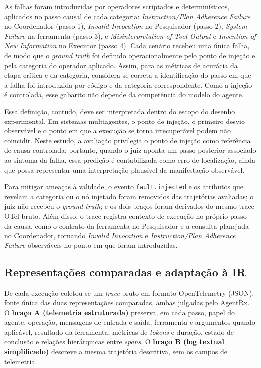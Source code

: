 \documentclass[sigconf]{acmart}
\begin{document}
As falhas foram introduzidas por operadores scriptados e determinísticos, aplicados no passo causal de cada categoria:
\textit{Instruction/Plan Adherence Failure} no Coordenador (passo 1), \textit{Invalid Invocation} no Pesquisador (passo
2), \textit{System Failure} na ferramenta (passo 3), e \textit{Misinterpretation of Tool Output} e \textit{Invention of
	New Information} no Executor (passo 4). Cada cenário recebeu uma única falha, de modo que o \textit{ground truth} foi
definido operacionalmente pelo ponto de injeção e pela categoria do operador aplicado. Assim, para as métricas de
acurácia da etapa crítica e da categoria, considera-se correta a identificação do passo em que a falha foi introduzida
por código e da categoria correspondente. Como a injeção é controlada, esse gabarito não depende da competência do
modelo do agente.

Essa definição, contudo, deve ser interpretada dentro do escopo do desenho experimental. Em sistemas multiagentes, o
ponto de injeção, o primeiro desvio observável e o ponto em que a execução se torna irrecuperável podem não coincidir.
Neste estudo, a avaliação privilegia o ponto de injeção como referência de causa controlada; portanto, quando o juiz
aponta um passo posterior associado ao sintoma da falha, essa predição é contabilizada como erro de localização, ainda
que possa representar uma interpretação plausível da manifestação observável.

Para mitigar ameaças à validade, o evento \texttt{fault.injected} e os atributos que revelam a categoria ou o nó
injetado foram removidos das trajetórias avaliadas; o juiz não recebeu o \textit{ground truth}; e os dois braços foram
derivados do mesmo trace OTel bruto. Além disso, o trace registra contexto de execução no próprio passo da causa, como
o contrato da ferramenta no Pesquisador e a consulta planejada no Coordenador, tornando \textit{Invalid Invocation} e
\textit{Instruction/Plan Adherence Failure} observáveis no ponto em que foram introduzidas.

\subsection{Representações comparadas e adaptação à IR}

De cada execução coletou-se um \textit{trace} bruto em formato OpenTelemetry (JSON), fonte única das duas
representações comparadas, ambas julgadas pelo AgentRx. O \textbf{braço A (telemetria estruturada)} preserva, em cada
passo, papel do agente, operação, mensagens de entrada e saída, ferramenta e argumentos quando aplicável, resultado da
ferramenta, métricas de \textit{tokens} e duração, estado de conclusão e relações hierárquicas entre \textit{spans}. O
\textbf{braço B (log textual simplificado)} descreve a mesma trajetória descritiva, sem os campos de telemetria.
\end{document}
